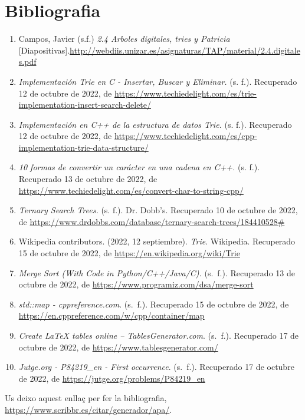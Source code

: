 \documentclass[titlepage]{article}
\begin{document}
\clearpage
\section{Bibliografia}
\begin{enumerate}
    \item Campos, Javier (s.f.) \textit{2.4 Arboles digitales, tries y Patricia} [Diapositivas].\url{http://webdiis.unizar.es/asignaturas/TAP/material/2.4.digitales.pdf }
    \item \textit{Implementación Trie en C - Insertar, Buscar y Eliminar.} (s. f.). Recuperado 12 de octubre de 2022, de \url{https://www.techiedelight.com/es/trie-implementation-insert-search-delete/}
    \item \textit{Implementación en C++ de la estructura de datos Trie.} (s. f.). Recuperado 12 de octubre de 2022, de \url{https://www.techiedelight.com/es/cpp-implementation-trie-data-structure/}
    \item \textit{10 formas de convertir un carácter en una cadena en C++.} (s. f.). Recuperado 13 de octubre de 2022, de \url{https://www.techiedelight.com/es/convert-char-to-string-cpp/}
    \item \textit{Ternary Search Trees.} (s. f.). Dr. Dobb's. Recuperado 10 de octubre de 2022, de \url{https://www.drdobbs.com/database/ternary-search-trees/184410528#}
    \item Wikipedia contributors. (2022, 12 septiembre). \textit{Trie}. Wikipedia. Recuperado 15 de octubre de 2022, de \url{https://en.wikipedia.org/wiki/Trie}
    \item \textit{Merge Sort (With Code in Python/C++/Java/C).} (s. f.). Recuperado 13 de octubre de 2022, de \url{https://www.programiz.com/dsa/merge-sort}
    \item \textit{std::map - cppreference.com}. (s. f.). Recuperado 15 de octubre de 2022, de
    \url{https://en.cppreference.com/w/cpp/container/map}
    \item \textit{Create LaTeX tables online – TablesGenerator.com}. (s. f.). Recuperado 17 de octubre de 2022, de \url{https://www.tablesgenerator.com/}

    \item \textit{Jutge.org - P84219\_en - First occurrence}. (s. f.). Recuperado 17 de octubre de 2022, de \url{https://jutge.org/problems/P84219_en}
\end{enumerate}

Us deixo aquest enllaç per fer la bibliografia, \url{https://www.scribbr.es/citar/generador/apa/}.
\end{document}
